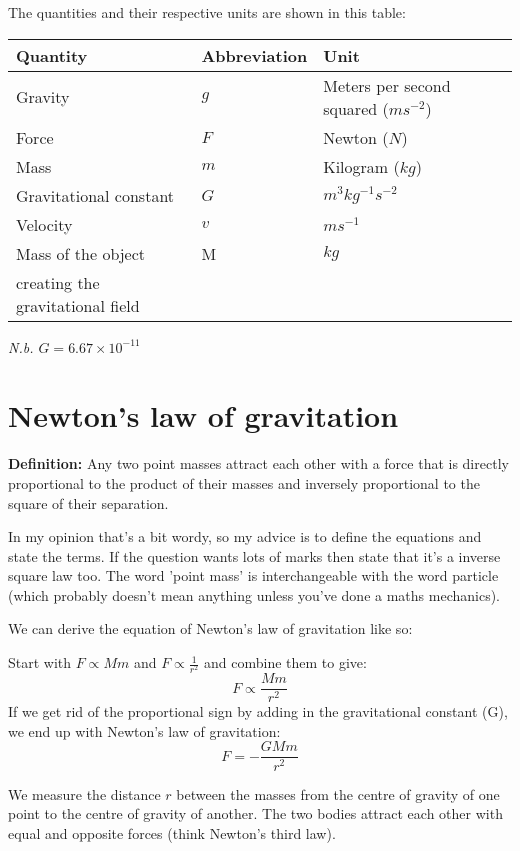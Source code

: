 \documentclass{article}
\begin{document}
The quantities and their respective units are shown in this table:

\begin{center}
	\begin{tabular}{|l|l|l|}
		\hline
			Quantity & Abbreviation & Unit \\ \hline
			Gravity & $g$ & Meters per second squared ($ms^{-2}$) \\ \hline
			Force & $F$ & Newton ($N$) \\ \hline
			Mass & $m$ & Kilogram ($kg$) \\ \hline
			Gravitational constant & $G$ & $m^3kg^{-1}s^{-2}$ \\ \hline
			Velocity & $v$ & $ms^{-1}$\\ \hline
			Mass of the object & M & $kg$ \\
			creating the gravitational field & & \\ \hline
	\end{tabular}
\end{center}
\textit{N.b. $G = 6.67 \times 10^{-11}$}



\section*{Newton's law of gravitation}
\textbf{Definition:} Any two point masses attract each other with a force that
is directly proportional to the product of their masses and inversely
proportional to the square of their separation.

In my opinion that's a bit wordy, so my advice is to define the equations and
state the terms. If the question wants lots of marks then state that it's a
inverse square law too. The word 'point mass' is interchangeable with the word
particle (which probably doesn't mean anything unless you've done a maths
mechanics).

We can derive the equation of Newton's law of gravitation like so:

Start with $F \propto Mm$ and $F \propto \frac{1}{r^2}$ and combine them to
give:
\[
	F \propto \frac{Mm}{r^2}
\]
If we get rid of the proportional sign by adding in the gravitational constant
(G), we end up with Newton's law of gravitation:
\[
	F = -\frac{GMm}{r^2}
\]

We measure the distance $r$ between the masses from the centre of gravity of one
point to the centre of gravity of another. The two bodies attract each other
with equal and opposite forces (think Newton's third law).
\end{document}
